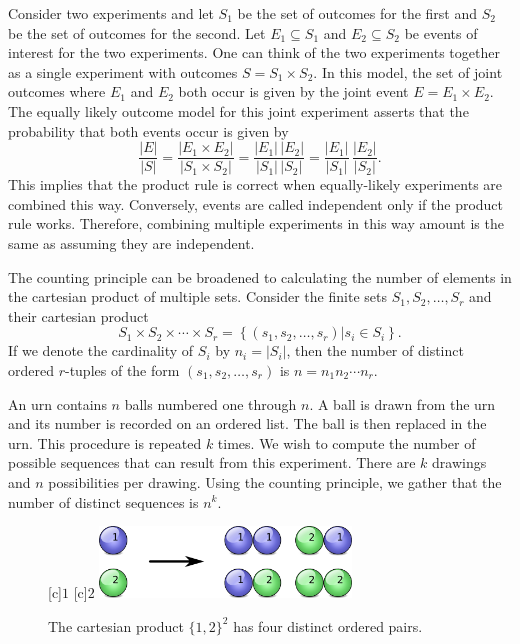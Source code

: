 \begin{example}
Consider two experiments and let $S_1$ be the set of outcomes for the first and $S_2$ be the set of outcomes for the second.
Let $E_1 \subseteq S_1$ and $E_2 \subseteq S_2$ be events of interest for the two experiments.
One can think of the two experiments together as a single experiment with outcomes $S = S_1 \times S_2$.
In this model, the set of joint outcomes where $E_1$ and $E_2$ both occur is given by the joint event $E = E_1 \times E_2$.
The equally likely outcome model for this joint experiment asserts that the probability that both events occur is given by
\[ \frac{|E|}{|S|} = \frac{|E_1 \times E_2|}{|S_1 \times S_2|} = \frac{|E_1|\,|E_2|}{|S_1|\,|S_2|} = \frac{|E_1|}{|S_1|}\,\frac{|E_2|}{|S_2|}. \]
This implies that the product rule is correct when equally-likely experiments are combined this way.
Conversely, events are called independent only if the product rule works.
Therefore, combining multiple experiments in this way amount is the same as assuming they are independent.
\end{example}

The counting principle can be broadened to calculating the number of elements in the cartesian product of multiple sets.
Consider the finite sets $S_1, S_2, \ldots, S_r$ and their cartesian product
\begin{equation*}
S_1 \times S_2 \times \cdots \times S_r
= \left\{ (s_1, s_2, \ldots, s_r) | s_i \in S_i \right\} .
\end{equation*}
If we denote the cardinality of $S_i$ by $n_i = | S_i |$, then the number of distinct ordered $r$-tuples of the form $(s_1, s_2, \ldots, s_r)$ is $n = n_1 n_2 \cdots n_r$.

\begin{example}
An urn contains $n$ balls numbered one through $n$.
A ball is drawn from the urn and its number is recorded on an ordered list.
The ball is then replaced in the urn.
This procedure is repeated $k$ times.
We wish to compute the number of possible sequences that can result from this experiment.
There are $k$ drawings and $n$ possibilities per drawing.
Using the counting principle, we gather that the number of distinct sequences is $n^k$.

\begin{figure}[htb!]
\begin{center}
\begin{psfrags}
[c]{$1$}
[c]{$2$}
\includegraphics[height=1.91cm]{Figures/4Chapter/sequences}
\end{psfrags}
\caption{The cartesian product $\{ 1, 2 \}^2$ has four distinct ordered pairs.}
\label{figure:Sequences}
\end{center}
\end{figure}
\end{example}

